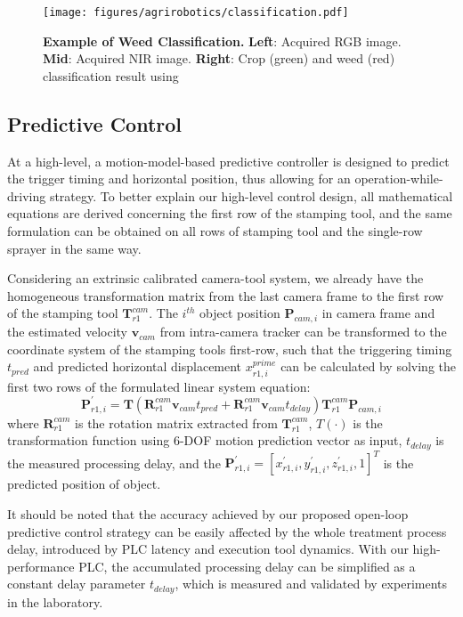 \begin{figure}[t]
    \centering
    \texttt{[image: figures/agrirobotics/classification.pdf]}
    \caption[Example of Weed Classification]{\textbf{Example of Weed Classification.} \textbf{Left}: Acquired RGB image. \textbf{Mid}: Acquired NIR image. \textbf{Right}: Crop (green) and weed (red) classification result using \cite{lottes2018fully}
	\label{fig:agrirobotics_classification}}
\end{figure}

\subsection{Predictive Control}

At a high-level, a motion-model-based predictive controller is designed to predict the trigger timing and horizontal position, thus allowing for an operation-while-driving strategy. To better explain our high-level control design, all mathematical equations are derived concerning the first row of the stamping tool, and the same formulation can be obtained on all rows of stamping tool and the single-row sprayer in the same way.

Considering an extrinsic calibrated camera-tool system, we already have the homogeneous transformation matrix from the last camera frame to the first row of the stamping tool $\mathbf{T}^{cam}_{r1}$. The $i^{th}$ object position $\mathbf{P}_{cam,i}$ in camera frame and the estimated velocity $\mathbf{v}_{cam}$ from intra-camera tracker can be transformed to the coordinate system of the stamping tools first-row, such that the triggering timing $t_{pred}$ and predicted horizontal displacement $x^{prime}_{r1,i}$ can be calculated by solving the first two rows of the formulated linear system equation: 
\begin{equation} \label{eq:agrirobitics_control}
\mathbf{P}^{\prime}_{r1,i} = \mathbf{T}( \mathbf{R}^{cam}_{r1}\mathbf{v}_{cam} t_{pred} + \mathbf{R}^{cam}_{r1}\mathbf{v}_{cam} t_{delay})  \mathbf{T}^{cam}_{r1} \mathbf{P}_{cam,i}  
\end{equation}
where $\mathbf{R}^{cam}_{r1}$ is the rotation matrix extracted from $\mathbf{T}^{cam}_{r1}$, $T(\cdot)$ is the transformation function using 6-DOF motion prediction vector as input, $t_{delay}$ is the measured processing delay, and the $\mathbf{P}^{\prime}_{r1,i} = [x^{\prime}_{r1,i}, y^{\prime}_{r1,i}, z^{\prime}_{r1,i},1]^T$ is the predicted position of object. 

It should be noted that the accuracy achieved by our proposed open-loop predictive control strategy can be easily affected by the whole treatment process delay, introduced by PLC latency and execution tool dynamics. With our high-performance PLC, the accumulated processing delay can be simplified as a constant delay parameter $t_{delay}$, which is measured and validated by experiments in the laboratory.

